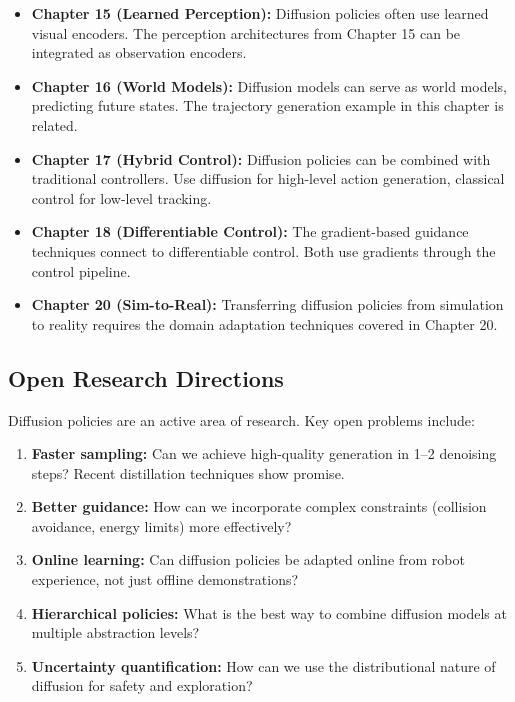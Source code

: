 \begin{itemize}
    \item \textbf{Chapter 15 (Learned Perception):} Diffusion policies often use learned visual encoders. The perception architectures from Chapter 15 can be integrated as observation encoders.

    \item \textbf{Chapter 16 (World Models):} Diffusion models can serve as world models, predicting future states. The trajectory generation example in this chapter is related.

    \item \textbf{Chapter 17 (Hybrid Control):} Diffusion policies can be combined with traditional controllers. Use diffusion for high-level action generation, classical control for low-level tracking.

    \item \textbf{Chapter 18 (Differentiable Control):} The gradient-based guidance techniques connect to differentiable control. Both use gradients through the control pipeline.

    \item \textbf{Chapter 20 (Sim-to-Real):} Transferring diffusion policies from simulation to reality requires the domain adaptation techniques covered in Chapter 20.
\end{itemize}

\subsection{Open Research Directions}

Diffusion policies are an active area of research. Key open problems include:

\begin{enumerate}
    \item \textbf{Faster sampling:} Can we achieve high-quality generation in 1--2 denoising steps? Recent distillation techniques show promise.

    \item \textbf{Better guidance:} How can we incorporate complex constraints (collision avoidance, energy limits) more effectively?

    \item \textbf{Online learning:} Can diffusion policies be adapted online from robot experience, not just offline demonstrations?

    \item \textbf{Hierarchical policies:} What is the best way to combine diffusion models at multiple abstraction levels?

    \item \textbf{Uncertainty quantification:} How can we use the distributional nature of diffusion for safety and exploration?
\end{enumerate}

